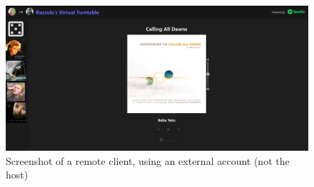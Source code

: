 \begin{uomappendix}
\begin{figure}[H]
                \begin{minipage}[b]{0.45\textwidth}
                    \centering
                    \includegraphics[width=\textwidth]{images/screenshots/LAPTOP_External.png}
                    \caption{Screenshot of a remote client, using an external account (not the host)}
                    \label{fig:laptopExternal}
                \end{minipage}
            \end{figure}
            

\end{uomappendix}
